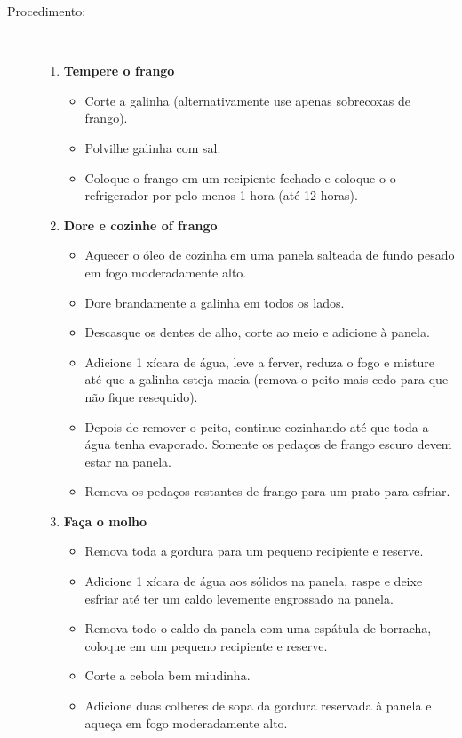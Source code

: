 \documentclass [11pt, letterpaper] {article}
\begin{document}
\begin {description}
\item [Procedimento:] \ \\
	\begin{enumerate}
	\item{\bf Tempere o frango}
	\begin{itemize}
        \item Corte a galinha (alternativamente use apenas sobrecoxas de frango).
        \item Polvilhe galinha com sal.
        \item Coloque o frango em um recipiente fechado e coloque-o
              o refrigerador por pelo menos 1 hora (até 12 horas).
        \end{itemize}
 	\item{\bf Dore e cozinhe of frango}
	\begin{itemize}       
        \item Aquecer o óleo de cozinha em uma panela salteada de fundo pesado em fogo moderadamente alto.
        \item Dore brandamente a galinha em todos os lados.
        \item Descasque os dentes de alho, corte ao meio e adicione \`a panela.
        \item Adicione 1 xícara de água, leve a ferver, reduza o fogo
          e misture até que a galinha esteja macia (remova o peito mais cedo para que não fique resequido).
        \item Depois de remover o peito, continue cozinhando até que toda a água tenha evaporado. Somente os pedaços de frango escuro devem estar na panela.
        \item Remova os pedaços restantes de frango para um prato para esfriar.
        \end{itemize}
 	\item{\bf Fa\c{c}a o molho}
	\begin{itemize}
        \item Remova toda a gordura para um pequeno recipiente e reserve.
        \item Adicione 1 xícara de água aos sólidos na panela, raspe e deixe esfriar até ter um caldo levemente engrossado na panela.
        \item Remova todo o caldo da panela com uma espátula de borracha,
        coloque em um pequeno recipiente e reserve.
        \item Corte a cebola bem miudinha.
        \item Adicione duas colheres de sopa da gordura reservada à panela e aque\c{c}a em fogo moderadamente alto.

\end{itemize}
\end{enumerate}
\end{description}
\end{document}
